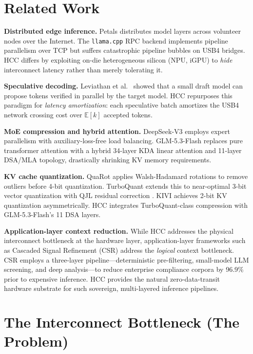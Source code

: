 \documentclass[11pt,a4paper]{article}
\begin{document}
\section{Related Work}

\textbf{Distributed edge inference.} Petals \cite{petals} distributes model layers across volunteer nodes over the Internet. The \texttt{llama.cpp} RPC backend \cite{llama_rpc} implements pipeline parallelism over TCP but suffers catastrophic pipeline bubbles on USB4 bridges. HCC differs by exploiting on-die heterogeneous silicon (NPU, iGPU) to \textit{hide} interconnect latency rather than merely tolerating it.

\textbf{Speculative decoding.} Leviathan et al.\ \cite{spec_decode} showed that a small draft model can propose tokens verified in parallel by the target model. HCC repurposes this paradigm for \textit{latency amortization}: each speculative batch amortizes the USB4 network crossing cost over $\mathbb{E}[k]$ accepted tokens.

\textbf{MoE compression and hybrid attention.} DeepSeek-V3 \cite{deepseek} employs expert parallelism with auxiliary-loss-free load balancing. GLM-5.3-Flash \cite{glm5} replaces pure transformer attention with a hybrid 34-layer KDA linear attention and 11-layer DSA/MLA topology, drastically shrinking KV memory requirements.

\textbf{KV cache quantization.} QuaRot \cite{quarot} applies Walsh-Hadamard rotations to remove outliers before 4-bit quantization. TurboQuant \cite{turboquant} extends this to near-optimal 3-bit vector quantization with QJL residual correction \cite{qjl}. KIVI \cite{kivi} achieves 2-bit KV quantization asymmetrically. HCC integrates TurboQuant-class compression with GLM-5.3-Flash's 11 DSA layers.

\textbf{Application-layer context reduction.} While HCC addresses the physical interconnect bottleneck at the hardware layer, application-layer frameworks such as Cascaded Signal Refinement (CSR) \cite{csr} address the \textit{logical} context bottleneck. CSR employs a three-layer pipeline---deterministic pre-filtering, small-model LLM screening, and deep analysis---to reduce enterprise compliance corpora by 96.9\% prior to expensive inference. HCC provides the natural zero-data-transit hardware substrate for such sovereign, multi-layered inference pipelines.

\section{The Interconnect Bottleneck (The Problem)}
\end{document}
